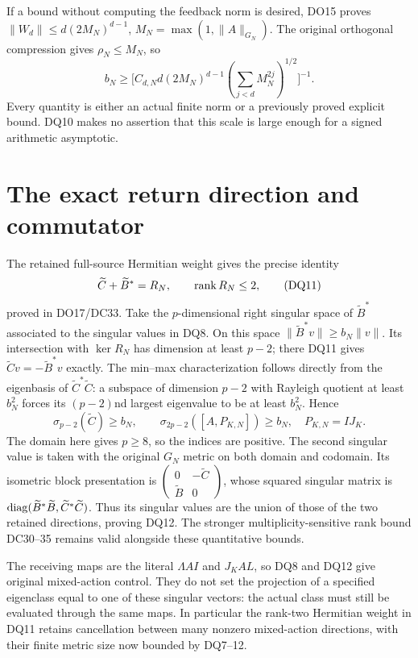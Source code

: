 If a bound without computing the feedback norm is desired, DO15 proves
$\|W_d\|\le d(2M_N)^{d-1}$, $M_N=\max(1,\|A\|_{G_N})$.
The original orthogonal compression gives $\rho_N\le M_N$, so
\[
 b_N\ge
 \bigl[C_{d,N}d(2M_N)^{d-1}
         (\sum_{j<d}M_N^{2j})^{1/2}\bigr]^{-1}.
 \tag{DQ10}
\]
Every quantity is either an actual finite norm or a previously proved
explicit bound. DQ10 makes no assertion that this scale is large enough
for a signed arithmetic asymptotic.

\section{The exact return direction and commutator}
The retained full-source Hermitian weight gives the precise identity
\[
 \widetilde C+\widetilde B^*=R_N,\qquad\operatorname{rank} R_N\le2,
 \tag{DQ11}
\]
proved in DO17/DC33. Take the $p$-dimensional right singular space of
$\widetilde B^*$ associated to the singular values in DQ8.
On this space $\|\widetilde B^*v\|\ge b_N\|v\|$.
Its intersection with $\ker R_N$ has dimension at least $p-2$;
there DQ11 gives $\widetilde Cv=-\widetilde B^*v$ exactly.
The min--max characterization follows directly from the eigenbasis of
$\widetilde C^*\widetilde C$: a subspace of dimension $p-2$
with Rayleigh quotient at least $b_N^2$ forces its $(p-2)$nd largest
eigenvalue to be at least $b_N^2$. Hence
\[
 \boxed{\sigma_{p-2}(\widetilde C)\ge b_N,
 \qquad \sigma_{2p-2}([A,P_{K,N}])\ge b_N,}
 \quad P_{K,N}=IJ_K.\tag{DQ12}
\]
The domain here gives $p\ge8$, so the indices are positive.
The second singular value is taken with the original $G_N$ metric
on both domain and codomain. Its isometric block presentation is
$\left(\begin{smallmatrix}0&-\widetilde C\\\widetilde B&0\end{smallmatrix}\right)$,
whose squared singular matrix is
$\operatorname{diag}(\widetilde B^*\widetilde B,\widetilde C^*\widetilde C)$.
Thus its singular values are the union of those of the two retained
directions, proving DQ12. The stronger multiplicity-sensitive rank
bound DC30--35 remains valid alongside these quantitative bounds.

The receiving maps are the literal $\Lambda AI$ and $J_KAL$, so
DQ8 and DQ12 give original mixed-action control. They do not set
the projection of a specified eigenclass equal to one of these singular
vectors: the actual class must still be evaluated through the same maps.
In particular the rank-two Hermitian weight in DQ11 retains cancellation
between many nonzero mixed-action directions, with their finite metric
size now bounded by DQ7--12.

